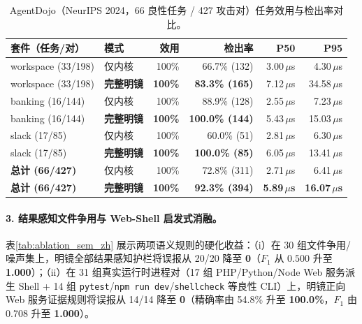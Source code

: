 \documentclass[UTF8,a4paper,zihao=-4,twocolumn]{ctexart}
\newcommand{\code}[1]{\texttt{\small #1}}
\begin{document}
\begin{table}[t]
\centering
\scriptsize
\setlength{\tabcolsep}{1.8pt}
\caption{AgentDojo（NeurIPS 2024，66 良性任务 / 427 攻击对）任务效用与检出率对比。}
\label{tab:ablation_agentdojo_zh}
\begin{tabular}{@{}llrrrr@{}}
\toprule
\textbf{套件（任务/对）} & \textbf{模式} & \textbf{效用} & \textbf{检出率} & \textbf{P50} & \textbf{P95} \\
\midrule
workspace (33/198) & 仅内核 & 100\% & 66.7\% (132) & 3.00\,$\mu$s & 4.30\,$\mu$s \\
workspace (33/198) & \textbf{完整明镜} & \textbf{100\%} & \textbf{83.3\% (165)} & 7.12\,$\mu$s & 34.58\,$\mu$s \\
\addlinespace[1pt]
banking (16/144)   & 仅内核 & 100\% & 88.9\% (128) & 2.55\,$\mu$s & 7.23\,$\mu$s \\
banking (16/144)   & \textbf{完整明镜} & \textbf{100\%} & \textbf{100.0\% (144)} & 5.43\,$\mu$s & 15.03\,$\mu$s \\
\addlinespace[1pt]
slack (17/85)      & 仅内核 & 100\% & 60.0\% (51) & 2.81\,$\mu$s & 6.30\,$\mu$s \\
slack (17/85)      & \textbf{完整明镜} & \textbf{100\%} & \textbf{100.0\% (85)} & 6.05\,$\mu$s & 13.41\,$\mu$s \\
\midrule
\textbf{总计 (66/427)} & 仅内核 & 100\% & 72.8\% (311) & 2.71\,$\mu$s & 6.41\,$\mu$s \\
\textbf{总计 (66/427)} & \textbf{完整明镜} & \textbf{100\%} & \textbf{92.3\% (394)} & \textbf{5.89\,$\mu$s} & \textbf{16.07\,$\mu$s} \\
\bottomrule
\end{tabular}
\end{table}

\paragraph{3. 结果感知文件争用与 Web-Shell 启发式消融。}
表\ref{tab:ablation_sem_zh} 展示两项语义规则的硬化收益：（i）在 30 组文件争用/噪声集上，明镜全部结果感知护栏将误报从 20/20 降至 \textbf{0}（$F_1$ 从 $0.500$ 升至 \textbf{1.000}）；（ii）在 31 组真实运行时进程对（17 组 PHP/Python/Node Web 服务派生 Shell + 14 组 \code{pytest}/\code{npm run dev}/\code{shellcheck} 等良性 CLI）上，明镜正向 Web 服务证据规则将误报从 14/14 降至 \textbf{0}（精确率由 54.8\% 升至 \textbf{100.0\%}，$F_1$ 由 0.708 升至 \textbf{1.000}）。
\end{document}
